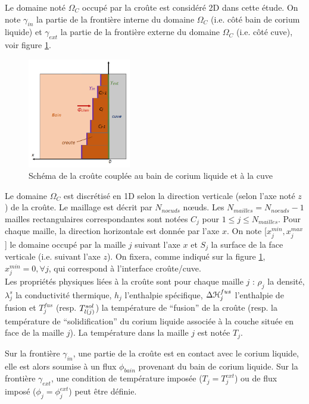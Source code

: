 Le domaine noté $\Omega_C$ occupé par la croûte est considéré 2D dans cette étude. On note $\gamma_{in}$ la partie de la frontière interne du domaine $\Omega_C$ (i.e. côté bain de corium liquide) et $\gamma_{ext}$ la partie de la frontière externe du domaine $\Omega_C$ (i.e. côté cuve), voir figure \ref{fig:crust_figure}. 

\begin{figure}[H]
\centering
\includegraphics[width=0.4\textwidth]{Figures/crust_figure.png}
\caption{Schéma de la croûte couplée au bain de corium liquide et à la cuve} \label{fig:crust_figure}
\end{figure}

Le domaine $\Omega_C$ est discrétisé en 1D selon la direction verticale (selon l'axe noté $z$) de la croûte. Le maillage est décrit par $N_{noeuds}$ n\oe{}uds. Les $N_{mailles}=N_{noeuds}-1$ mailles rectangulaires correspondantes sont notées $C_j$ pour $1 \leq j\leq N_{mailles}$. Pour chaque maille, la direction horizontale est donnée par l'axe $x$. On note [$x_j^{min}, x_j^{max}$] le domaine occupé par la maille $j$ suivant l'axe $x$ et $S_j$ la surface de la face verticale (i.e. suivant l'axe $z$). On fixera, comme indiqué sur la figure \ref{fig:crust_figure}, $x_j^{min}=0,\forall j$, qui correspond à l'interface croûte/cuve.\\

Les propriétés physiques liées à la croûte sont pour chaque maille $j$ : $\rho_j$ la densité, $\lambda^s_j$ la conductivité thermique, $h_j$ l'enthalpie spécifique, $\Delta {\cal H}_j^{fus}$ l'enthalpie de fusion et $T_j^{fus}$ (resp. $\temperature[sol]{l(j)}$) la température de ``fusion'' de la croûte (resp. la température de ``solidification'' du corium liquide associée à la couche située en face de la maille $j$). La température dans la maille $j$ est notée $T_j$.

Sur la frontière $\gamma_{in}$, une partie de la croûte est en contact avec le corium liquide, elle est alors soumise à un flux $\phi_{bain}$ provenant du bain de corium liquide. Sur la frontière $\gamma_{ext}$, une condition de température imposée ($T_j=T_j^{ext}$) ou de flux imposé ($\phi_j=\phi_j^{ext}$) peut être définie.\\
 
